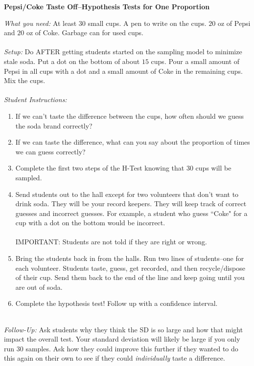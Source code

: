 \documentclass[12pt]{amsart}
\theoremstyle{definition}
\begin{document}
 \begin{framed}
 	\begin{center} \textbf{Pepsi/Coke Taste Off--Hypothesis Tests for One Proportion} \end{center}
 	\emph{What you need:} At least $30$ small cups. A pen to write on the cups. $20$ oz of Pepsi and $20$ oz of Coke. Garbage can for used cups.\\
 	~\\
 	\emph{Setup:} Do AFTER getting students started on the sampling model to minimize stale soda. Put a dot on the bottom of about $15$ cups. Pour a small amount of Pepsi in all cups with a dot and a small amount of Coke in the remaining cups. Mix the cups.\\
 	~\\
 	\emph{Student Instructions:}
 	\begin{enumerate}
 		\item If we can't taste the difference between the cups, how often should we guess the soda brand correctly?
 		\item If we can taste the difference, what can you say about the proportion of times we can guess correctly?
 		\item Complete the first two steps of the H-Test knowing that $30$ cups will be sampled.
 		\item Send students out to the hall except for two volunteers that don't want to drink soda. They will be your record keepers. They will keep track of correct guesses and incorrect guesses. For example, a student who guess ``Coke" for a cup with a dot on the bottom would be incorrect.\\
 		~\\
 		IMPORTANT: Students are not told if they are right or wrong.
 		\item Bring the students back in from the halls. Run two lines of students--one for each volunteer. Students taste, guess, get recorded, and then recycle/dispose of their cup. Send them back to the end of the line and keep going until you are out of soda.
 		\item Complete the hypothesis test! Follow up with a confidence interval.
 	\end{enumerate}
 	~\\
 	\emph{Follow-Up:} Ask students why they think the SD is so large and how that might impact the overall test. Your standard deviation will likely be large if you only run $30$ samples. Ask how they could improve this further if they wanted to do this again on their own to see if they could \textit{individually} taste a difference.
 \end{framed}
 
\end{document}

